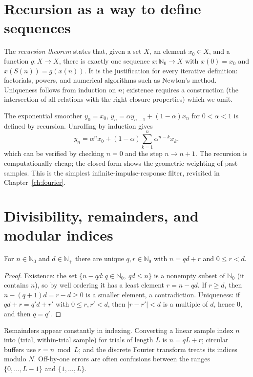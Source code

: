 \section{Recursion as a way to define sequences}
The \emph{recursion theorem} states that, given a set $X$, an element $x_0\in X$, and a function $g:X\to X$, there is exactly one sequence $x:\mathbb N_0\to X$ with $x(0)=x_0$ and $x(S(n))=g(x(n))$. It is the justification for every iterative definition: factorials, powers, and numerical algorithms such as Newton's method. Uniqueness follows from induction on $n$; existence requires a construction (the intersection of all relations with the right closure properties) which we omit.

\begin{workedexample}
The exponential smoother $y_0=x_0$, $y_{n}=\alpha y_{n-1}+(1-\alpha)x_n$ for $0<\alpha<1$ is defined by recursion. Unrolling by induction gives
\[
y_n=\alpha^nx_0+(1-\alpha)\sum_{k=1}^{n}\alpha^{n-k}x_k,
\]
which can be verified by checking $n=0$ and the step $n\to n+1$. The recursion is computationally cheap; the closed form shows the geometric weighting of past samples. This is the simplest infinite-impulse-response filter, revisited in Chapter~\ref{ch:fourier}.
\end{workedexample}

\section{Divisibility, remainders, and modular indices}
\begin{theorem}
For $n\in\mathbb N_0$ and $d\in\mathbb N_+$ there are unique $q,r\in\mathbb N_0$ with $n=qd+r$ and $0\le r<d$.
\end{theorem}
\begin{proof}
Existence: the set $\{n-qd:q\in\mathbb N_0,\ qd\le n\}$ is a nonempty subset of $\mathbb N_0$ (it contains $n$), so by well ordering it has a least element $r=n-qd$. If $r\ge d$, then $n-(q+1)d=r-d\ge0$ is a smaller element, a contradiction. Uniqueness: if $qd+r=q'd+r'$ with $0\le r,r'<d$, then $|r-r'|<d$ is a multiple of $d$, hence $0$, and then $q=q'$.
\end{proof}
Remainders appear constantly in indexing. Converting a linear sample index $n$ into (trial, within-trial sample) for trials of length $L$ is $n=qL+r$; circular buffers use $r=n\bmod L$; and the discrete Fourier transform treats its indices modulo $N$. Off-by-one errors are often confusions between the ranges $\{0,\ldots,L-1\}$ and $\{1,\ldots,L\}$.

